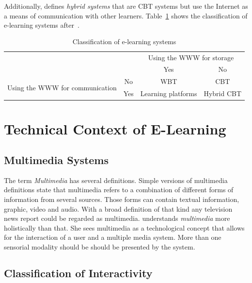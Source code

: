 Additionally,  \citeyear{Richert2007} defines
\emph{hybrid systems} that are CBT systems but use the Internet as a means of
communication with other learners.
Table~\ref{table:elearningsystems} shows the classification of e-learning systems
after~.
\begin{table}[htbp]
\begin{center}
\begin{tabular}{|c|c|c|c|}
  \hline
  \multicolumn{2}{|c|}{} & \multicolumn{2}{|c|}{Using the WWW for storage} \\
  \cline{3-4}
  \multicolumn{2}{|c|}{} & Yes & No \\
  \hline
  \multirow{2}{*}{Using the WWW for communication} & No & WBT & CBT \\
  \cline{2-4}
   & Yes & Learning platforms & Hybrid CBT \\
  \hline
\end{tabular}
\caption{Classification of e-learning systems}
\label{table:elearningsystems}
\end{center}
\end{table}

\section{Technical Context of E-Learning}
\label{sec:elearn:technicalcontext}

\subsection{Multimedia Systems}
\label{sec:elearn:multimediasystems}

The term \emph{Multimedia} has several definitions. Simple versions of 
multimedia definitions state that multimedia refers to a combination of
different forms of information from several sources. Those forms can contain
textual information, graphic, video and audio. With a broad definition
of that kind any television news report could be regarded as multimedia.
 \citeyear{Richert2007} understands \emph{multimedia}
more holistically than that. She sees multimedia as a technological concept 
that allows for the interaction of a user and a multiple media system.
More than one sensorial modality should be should be presented by the system.

\subsection{Classification of Interactivity}
\label{sec:elearn:interactivity}

